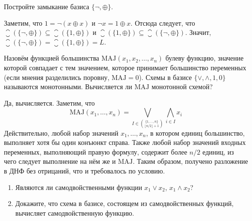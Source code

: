 \begin{Exercise}[counter=SecExercise, label={exercise:boolean:linear_closure}]
    \noindent
    Постройте замыкание базиса $ \{\neg, \oplus\} $.
\end{Exercise}

\begin{Answer}
    \noindent
    Заметим, что $ 1 = \neg (x \oplus x) $ и $ \neg x = 1 \oplus x $.
    Отсюда следует, что $ \closure(\{\neg, \oplus\}) \subseteq \closure(\{1, \oplus\}) $ и $ \closure(\{1, \oplus\}) \subseteq \closure(\{\neg, \oplus\}) $.
    Значит, $ \closure(\{\neg, \oplus\}) = \closure(\{1, \oplus\}) = L $.
\end{Answer}

\begin{Exercise}[counter=SecExercise, label={exercise:boolean:monotonous_and_MAJ}]
    \noindent
    Назовём функцией большинства $ \text{MAJ}(x_1, x_2,\ldots , x_n) $ булеву функцию,
    значение которой совпадает с тем значением,
    которое принимает большинство переменных (если мнения разделились поровну, $ \text{MAJ} = 0 $).
    Схемы в базисе $ \{\vee, \wedge, 1, 0 \} $ называются монотонными.
    Вычисляется ли $ \text{MAJ} $ монотонной схемой?
\end{Exercise}

\begin{Answer}
    \noindent
    Да, вычисляется.
    Заметим, что
    \[
        \text{MAJ}(x_1, \ldots, x_n) = \bigvee_{I \in \binom{\{1, \ldots, n\}}{\lfloor n/2 \rfloor + 1}} \bigwedge_{i \in I} x_i
    \]
    Действительно, любой набор значений $ x_1, \ldots, x_n $, в котором единиц большинство, выполняет хотя бы один конъюнкт справа.
    Также любой набор значений входных переменных, выполняющий правую формулу, содержит более $ n/2 $ единиц,
    из чего следует выполнение на нём же и $ \text{MAJ} $.
    Таким образом, получено разложение в ДНФ без отрицаний, что и требовалось по условию.
\end{Answer}


\begin{Exercise}[counter=SecExercise, label={exercise:boolean:self_dual}]
    \noindent
    \begin{enumerate}[label=\textbf{\alph*)}]
        \item
            Являются ли самодвойственными функции $ x_1 \vee x_2 $, $ x_1 \wedge x_2 $?
        \item
            Докажите, что схема в базисе, состоящем из самодвойственных функций,
            вычисляет самодвойственную функцию.
    \end{enumerate}
\end{Exercise}

